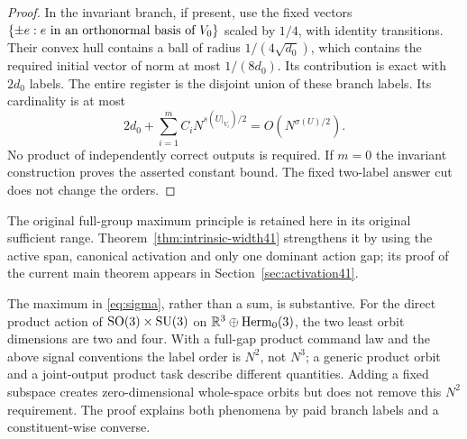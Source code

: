 \begin{proof}
In the invariant branch, if present, use the fixed vectors
$\{\pm e:e\hbox{ in an orthonormal basis of }V_0\}$ scaled by
$1/4$, with identity transitions. Their convex hull contains a ball
of radius $1/(4\sqrt{d_0})$, which contains the required initial
vector of norm at most $1/(8d_0)$. Its contribution is exact with
$2d_0$ labels. The entire register is the disjoint union of these
branch labels. Its cardinality is at most
\[
 2d_0+\sum_{i=1}^m C_i N^{s(U|_{V_i})/2}
                   =O(N^{\sigma(U)/2}).
\]
No product of independently correct outputs is required. If $m=0$
the invariant construction proves the asserted constant bound. The
fixed two-label answer cut does not change the orders.
\end{proof}

The original full-group maximum principle is retained here in its
original sufficient range. Theorem~\ref{thm:intrinsic-width41} strengthens
it by using the active span, canonical activation and only one dominant
action gap; its proof of the current main theorem appears in
Section~\ref{sec:activation41}.

The maximum in \eqref{eq:sigma}, rather than a sum, is substantive.
For the direct product action of $\operatorname{SO}(3)\times\operatorname{SU}(3)$ on
$\mathbb R^3\oplus\operatorname{Herm}_0(3)$, the two least orbit dimensions are two and
four. With a full-gap product command law and the above signal
conventions the label order is $N^2$, not $N^3$; a generic product
orbit and a joint-output product task describe different quantities.
Adding a fixed subspace creates zero-dimensional whole-space orbits
but does not remove this $N^2$ requirement. The proof explains both
phenomena by paid branch labels and a constituent-wise converse.


